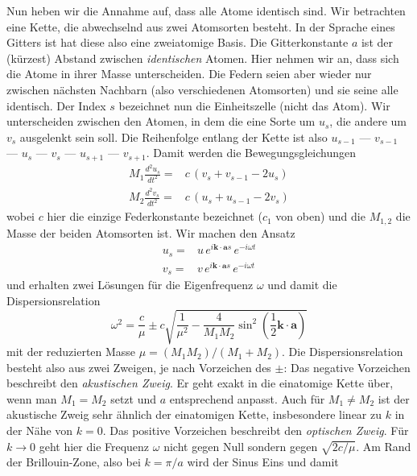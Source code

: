 Nun heben wir die Annahme auf, dass alle Atome identisch sind. Wir betrachten eine Kette, die abwechselnd aus zwei Atomsorten besteht. In der Sprache eines Gitters ist hat diese also eine zweiatomige Basis. Die Gitterkonstante $a$ ist der (kürzest) Abstand zwischen \emph{identischen} Atomen. Hier nehmen wir an, dass sich die Atome in ihrer Masse unterscheiden. Die Federn seien aber wieder nur zwischen nächsten Nachbarn (also verschiedenen Atomsorten) und sie seine alle identisch. Der Index $s$ bezeichnet nun die Einheitszelle (nicht das Atom). Wir unterscheiden zwischen den Atomen, in dem die eine Sorte um $u_s$, die andere um $v_s$ ausgelenkt sein soll.  Die Reihenfolge entlang der Kette ist also $u_{s-1}$ ---  $v_{s-1}$ --- $u_{s}$ ---  $v_{s}$ --- $u_{s+1}$ ---  $v_{s+1}$. Damit werden die Bewegungsgleichungen
\begin{align}
 M_1 \frac{d^2 u_s}{dt^2} = & c \, \left( v_s + v_{s-1} - 2 u_s \right) \\
 M_2 \frac{d^2 v_s}{dt^2} = & c \, \left( u_s + u_{s-1} - 2 v_s \right) 
\end{align}
wobei $c$ hier die einzige Federkonstante bezeichnet ($c_1$ von oben) und die $M_{1,2}$ die Masse der beiden Atomsorten ist.
Wir machen den Ansatz
\begin{align}
  u_s   = & u \,   e^{i \mathbf{k} \cdot \mathbf{a}  s} \, e^{-i \omega t} \\
  v_s  = & v  \, e^{i \mathbf{k} \cdot \mathbf{a}  s} \, e^{-i \omega t}
\end{align}
und erhalten zwei Lösungen für die Eigenfrequenz $\omega$ und damit die Dispersionsrelation
\begin{equation}
\omega^2 =  \frac{c}{\mu}
\pm c \sqrt{ \frac{1}{\mu^2} - \frac{4}{M_1 M_2}  \sin^2 \left( \frac{1}{2}  \mathbf{k} \cdot \mathbf{a} \right) } 
\end{equation}
mit der reduzierten Masse $\mu = (M_1  M_2)/(M_1 + M_2)$. Die Dispersionsrelation besteht also aus zwei Zweigen, je nach Vorzeichen des $\pm$: Das negative Vorzeichen beschreibt den \emph{akustischen Zweig}. Er geht exakt in die einatomige Kette über, wenn man $M_1 = M_2$ setzt und $a$ entsprechend anpasst. Auch für $M_1 \neq M_2$ ist der akustische Zweig sehr ähnlich der einatomigen Kette, insbesondere linear zu $k$ in der Nähe von $k=0$. Das positive Vorzeichen beschreibt den \emph{optischen Zweig}. Für $k \rightarrow 0$ geht hier die Frequenz $\omega$ nicht gegen Null sondern gegen $\sqrt{2 c / \mu}$. Am Rand der Brillouin-Zone, also bei $k = \pi /a $ wird der Sinus Eins und damit
